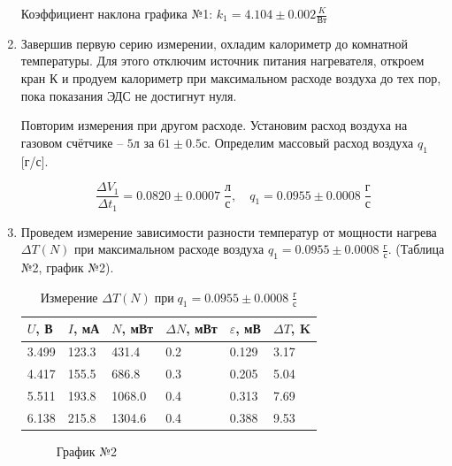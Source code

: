 \documentclass[a4paper,12pt]{article}
\begin{document}
\begin{enumerate}
		Коэффициент наклона графика №1: $k_1 = 4.104\pm0.002 \frac{K}{Вт}$

		\item Завершив первую серию измерении, охладим калориметр до комнатной температуры.
		Для этого отключим источник питания нагревателя, откроем кран К и продуем калориметр при максимальном расходе воздуха до тех пор, пока показания ЭДС не достигнут нуля.

		Повторим измерения при другом расходе. Установим расход воздуха на газовом счётчике -- $5$л за $61 \pm 0.5$с. Определим массовый расход воздуха $q_1$ [г/с].

		$$\frac{\Delta V_1}{\Delta t_1} = 0.0820 \pm 0.0007 \; \frac{л}{с} ,\quad  q_1 = 0.0955 \pm 0.0008 \; \frac{г}{с} $$

		\item Проведем измерение зависимости разности температур от мощности нагрева $\Delta T(N)$ при максимальном расходе воздуха $q_1 = 0.0955 \pm 0.0008 \; \frac{г}{с}$. (Таблица №2, график №2).

		\begin{table}[h!]
			\caption{Измерение $\Delta T (N) \; {при} \; q_1 = 0.0955 \pm 0.0008 \; \frac{г}{с}$}
			\begin{center}
				\begin{tabular}{|*{6}{l|}}
					\hline
					$U$, В & $I$, мА & $N$, мВт & $\Delta N$, мВт &$\varepsilon$, мВ & $\Delta T$, K\\ \hline
					3.499 & 123.3 & 431.4 & 0.2 & 0.129 & 3.17 \\ \hline
					4.417 & 155.5 & 686.8 & 0.3 & 0.205 & 5.04 \\ \hline
					5.511 & 193.8 & 1068.0 & 0.4 & 0.313 & 7.69 \\ \hline
					6.138 & 215.8 & 1304.6 & 0.4 & 0.388 & 9.53 \\ \hline
				\end{tabular}
			\end{center}
		\end{table}

		\begin{figure}[h!]
			\caption[]{\label{fig:4} График №2}
		\end{figure}


\end{enumerate}
\end{document}
